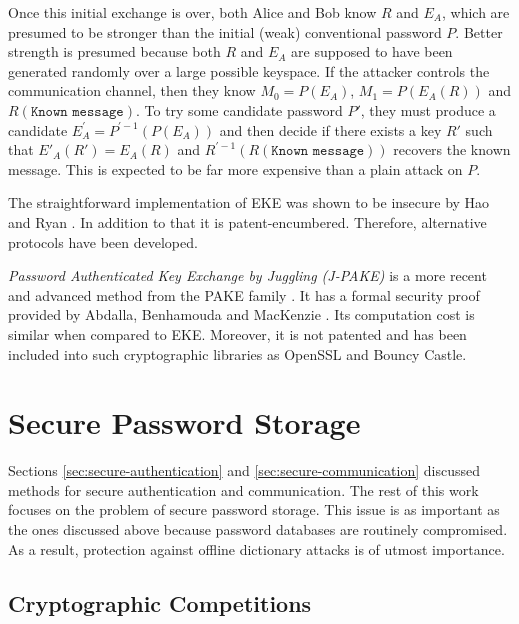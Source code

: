 Once this initial exchange is over, both Alice and Bob know \(R\) and \(E_A\), which are presumed to be stronger than the initial (weak) conventional password \(P\). Better strength is presumed because both \(R\) and \(E_A\) are supposed to have been generated randomly over a large possible keyspace. If the attacker controls the communication channel, then they know \(M_0 = P(E_A)\), \(M_1 = P(E_A(R))\) and \(R(\texttt{Known message})\). To try some candidate password \(P'\), they must produce a candidate \(E_A^{'} = P^{'-1}(P(E_A))\) and then decide if there exists a key \(R'\) such that \(E'_A(R') = E_A(R)\) and \(R^{'-1}(R(\texttt{Known message}))\) recovers the known message. This is expected to be far more expensive than a plain attack on \(P\).

The straightforward implementation of EKE was shown to be insecure by Hao and Ryan \cite{hao2010j}. In addition to that it is patent-encumbered. Therefore, alternative protocols have been developed.

\emph{Password Authenticated Key Exchange by Juggling (J-PAKE)} is a more recent and advanced method from the PAKE family \cite{hao2010j}. It has a formal security proof provided by Abdalla, Benhamouda and MacKenzie \cite{abdalla2015security}. Its computation cost is similar when compared to EKE. Moreover, it is not patented and has been included into such cryptographic libraries as OpenSSL and Bouncy Castle.

\section{Secure Password Storage}
\label{sec:secure-password-storage}

Sections \ref{sec:secure-authentication} and \ref{sec:secure-communication} discussed methods for secure authentication and communication. The rest of this work focuses on the problem of secure password storage. This issue is as important as the ones discussed above because password databases are routinely compromised. As a result, protection against offline dictionary attacks is of utmost importance.

\subsection{Cryptographic Competitions}
\label{sec:cryptocomps}

